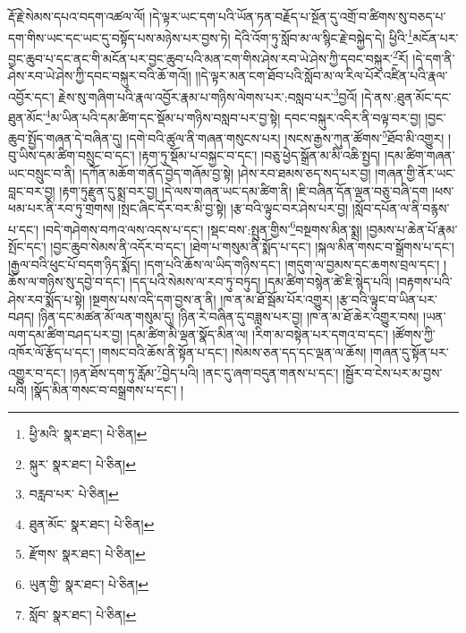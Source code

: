 རྡོ་རྗེ་སེམས་དཔའ་བདག་འཚལ་ལོ། །དེ་ལྟར་ཡང་དག་པའི་ཡོན་ཏན་བརྗོད་པ་སྔོན་དུ་འགྲོ་བ་ཚིགས་སུ་བཅད་པ་དག་གིས་ཡང་དང་ཡང་དུ་བསྟོད་པས་མཉེས་པར་བྱས་ཏེ། དེའི་འོག་ཏུ་སློབ་མ་ལ་སྙིང་རྗེ་བསྐྱེད་དེ། ཕྱིའི་\footnote{ཕྱི་མའི་  སྣར་ཐང་།  པེ་ཅིན། }མངོན་པར་བྱང་ཆུབ་པ་དང་ནང་གི་མངོན་པར་བྱང་ཆུབ་པའི་མན་ངག་གིས་ཤེས་རབ་ཡེ་ཤེས་ཀྱི་དབང་བསྐུར་\footnote{སྐུར་  སྣར་ཐང་།  པེ་ཅིན། }རོ། །དེ་དག་ནི་ཤེས་རབ་ཡེ་ཤེས་ཀྱི་དབང་བསྐུར་བའི་ཆོ་གའོ།། །།དེ་ལྟར་མན་ངག་ཐོབ་པའི་སློབ་མ་ལ་རིལ་པོར་འཛིན་པའི་རྣལ་འབྱོར་དང་། རྗེས་སུ་གཞིག་པའི་རྣལ་འབྱོར་རྣམ་པ་གཉིས་ལེགས་པར་:བསླབ་པར་\footnote{བརླབ་པར་  པེ་ཅིན། }བྱའོ། །དེ་ནས་:ཐུན་མོང་དང་ཐུན་མོང་\footnote{ཐུན་མོང་  སྣར་ཐང་།  པེ་ཅིན། }མ་ཡིན་པའི་དམ་ཚིག་དང་སྡོམ་པ་གཉིས་བསླབ་པར་བྱ་སྟེ། དབང་བསྐུར་འདིར་ནི་བལྟ་བར་བྱ། །བྱང་ཆུབ་སྤྱོད་གཞན་དེ་བཞིན་དུ། །དགེ་བའི་ཚུལ་ནི་གཞན་གསུངས་པར། །སངས་རྒྱས་ཀུན་ཚོགས་\footnote{རྫོགས་  སྣར་ཐང་།  པེ་ཅིན། }ཐོབ་མི་འགྱུར། །བུ་ཡིས་དམ་ཚིག་བསྲུང་བ་དང་། །རྟག་ཏུ་སྡོམ་པ་བསྐྱང་བ་དང་། །བཅུ་ཕྱེད་སྒྲོན་མ་མི་འཆི་སྤྱད། །དམ་ཚིག་གཞན་ཡང་བསྲུང་བ་ནི། །དཀོན་མཆོག་གནོད་བྱེད་གཞོམ་བྱ་སྟེ། །ཤེས་རབ་ཐམས་ཅད་སད་པར་བྱ། །གཞན་གྱི་ནོར་ཡང་བླང་བར་བྱ། །རྟག་ཏུརྫུན་དུ་སྨྲ་བར་བྱ། །དེ་ལས་གཞན་ཡང་དམ་ཚིག་ནི། །ཇི་བཞིན་དོན་ལྡན་བཅུ་བཞི་དག །ཕས་ཕམ་པར་ནི་རབ་ཏུ་གྲགས། །སྤང་ཞིང་དོར་བར་མི་བྱ་སྟེ། །རྩ་བའི་ལྟུང་བར་ཤེས་པར་བྱ། །སློབ་དཔོན་ལ་ནི་བརྙས་པ་དང་། །བདེ་གཤེགས་བཀའ་ལས་འདས་པ་དང་། །སྡང་བས་:སྤུན་གྱིས་\footnote{ཡུན་གྱི་  སྣར་ཐང་།  པེ་ཅིན། }བསྔགས་མིན་སྨྲ། །བྱམས་པ་ཆེན་པོ་རྣམ་སྤོང་དང་། །བྱང་ཆུབ་སེམས་ནི་འདོར་བ་དང་། །ཐེག་པ་གསུམ་ནི་སྨོད་པ་དང་། །སྐལ་མིན་གསང་བ་སྒྲོགས་པ་དང་། །རྒྱལ་བའི་ཕུང་པོ་བདག་ཉིད་སྨོད། །དག་པའི་ཆོས་ལ་ཡིད་གཉིས་དང་། །གདུག་ལ་བྱམས་དང་ཆགས་བྲལ་དང་། །ཆོས་ལ་གཉིས་སུ་དབྱེ་བ་དང་། །དད་པའི་སེམས་ལ་རབ་ཏུ་བཏུད། །དམ་ཚིག་བསྙེན་ཚེ་ཇི་སྙེད་པའི། །བརྟགས་པའི་ཤེས་རབ་སྨོད་པ་སྟེ། །སྔགས་པས་འདི་དག་བྱས་ན་ནི། །ཁ་ན་མ་ཐོ་སྦོམ་པོར་འགྱུར། །རྩ་བའི་ལྟུང་བ་ཡིན་པར་བཤད། །ཉིན་དང་མཚན་མོ་ལན་གསུམ་དུ། །ཉིན་རེ་བཞིན་དུ་བཟླས་པར་བྱ། །ཁ་ན་མ་ཐོ་ཆེར་འགྱུར་བས། །ཡན་ལག་དམ་ཚིག་བཤད་པར་བྱ། །དམ་ཚིག་མི་ལྡན་སྣོད་མིན་ལ། །རིག་མ་བསྟེན་པར་དགའ་བ་དང་། །ཚོགས་ཀྱི་འཁོར་ལོ་རྩོད་པ་དང་། །གསང་བའི་ཆོས་ནི་སྟོན་པ་དང་། །སེམས་ཅན་དད་དང་ལྡན་ལ་ཆོས། །གཞན་དུ་སྟོན་པར་འགྱུར་བ་དང་། །ཉན་ཐོས་དག་ཏུ་རློམ་\footnote{སློབ་  སྣར་ཐང་།  པེ་ཅིན། }བྱེད་པའི། །ནང་དུ་ཞག་བདུན་གནས་པ་དང་། །སྦྱོར་བ་ངེས་པར་མ་བྱས་པའི། །སྣོད་མིན་གསང་བ་བསྒྲགས་པ་དང་། །

